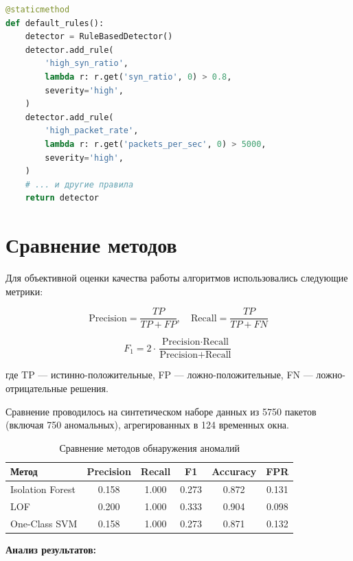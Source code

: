 \begin{lstlisting}[caption=Добавление правил, label=lst:rules, language=Python]
@staticmethod
def default_rules():
    detector = RuleBasedDetector()
    detector.add_rule(
        'high_syn_ratio',
        lambda r: r.get('syn_ratio', 0) > 0.8,
        severity='high',
    )
    detector.add_rule(
        'high_packet_rate',
        lambda r: r.get('packets_per_sec', 0) > 5000,
        severity='high',
    )
    # ... и другие правила
    return detector
\end{lstlisting}

\section{Сравнение методов}

Для объективной оценки качества работы алгоритмов использовались следующие метрики:

\begin{equation}
\label{eq:precision}
\text{Precision} = \frac{TP}{TP + FP},\quad
\text{Recall} = \frac{TP}{TP + FN}
\end{equation}

\begin{equation}
\label{eq:f1}
F_1 = 2 \cdot \frac{\text{Precision} \cdot \text{Recall}}{\text{Precision} + \text{Recall}}
\end{equation}

где TP — истинно-положительные, FP — ложно-положительные, FN — ложно-отрицательные решения.

Сравнение проводилось на синтетическом наборе данных из 5750 пакетов (включая 750 аномальных), агрегированных в 124 временных окна.

\begin{table}[H]
\centering
\caption{Сравнение методов обнаружения аномалий}
\label{tab:comparison_results}
\begin{tabular}{lccccc}
\toprule
\textbf{Метод} & \textbf{Precision} & \textbf{Recall} & \textbf{F1} & \textbf{Accuracy} & \textbf{FPR} \\
\midrule
Isolation Forest & 0.158 & 1.000 & 0.273 & 0.872 & 0.131 \\
LOF & 0.200 & 1.000 & 0.333 & 0.904 & 0.098 \\
One-Class SVM & 0.158 & 1.000 & 0.273 & 0.871 & 0.132 \\
\bottomrule
\end{tabular}
\end{table}

\textbf{Анализ результатов:}


